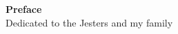\vspace*{\fill}
  \begin{center}
    \textbf{Preface}\\
    Dedicated to the Jesters and my family
  \end{center}
\vspace*{\fill}
\pagebreak
